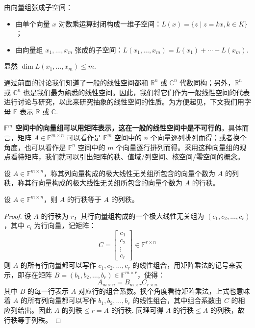 \begin{definition}
由向量组张成子空间：
\begin{itemize}
    \item 由单个向量 $x$ 对数乘运算封闭构成一维子空间：$L(x)=\{z\mid z=kx,k\in K\}$；
    \item 由向量组 $x_1,\ldots,x_m$ 张成的子空间：$L(x_1,\ldots,x_m)=L(x_1)+\cdots+L(x_m)$.
\end{itemize}
显然 $\dim L(x_1,\ldots,x_m)\leq m$.    
\end{definition}

通过前面的讨论我们知道了一般的线性空间都和 $\mathbb R^n$ 或 $\mathbb C^n$ 代数同构；另外，$\mathbb R^n$ 或 $\mathbb C^n$ 也是我们最为熟悉的线性空间。因此，我们将它们作为一般线性空间的代表进行讨论与研究，以此来研究抽象的线性空间的性质。为方便起见，下文我们用字母 $\mathbb F$ 表示 $\mathbb R$ 或 $\mathbb C$.

\textbf{$\mathbb F^m$ 空间中的向量组可以用矩阵表示，这在一般的线性空间中是不可行的}。具体而言，矩阵 $A\in\mathbb F^{m\times n}$ 可以看作是 $\mathbb F^m$ 空间中的 $n$ 个向量逐列排列而得；或者换个角度，也可以看作是 $\mathbb F^n$ 空间中的 $m$ 个向量逐行排列而得。采用这种向量组的观点看待矩阵，我们就可以引出矩阵的秩、值域/列空间、核空间/零空间的概念。

\begin{definition}[列秩，行秩]
设 $A\in\mathbb F^{m\times n}$，称其列向量构成的极大线性无关组所包含的向量个数为 $A$ 的列秩，称其行向量构成的极大线性无关组所包含的向量个数为 $A$ 的行秩。
\end{definition}

\begin{theorem}[行秩等于列秩]
设 $A\in\mathbb F^{m\times n}$，则 $A$ 的行秩等于 $A$ 的列秩。
\end{theorem}
\begin{proof}
设 $A$ 的行秩为 $r$，其行向量组构成的一个极大线性无关组为 $(c_1,c_2,\ldots,c_r)$，其中 $c_i$ 为行向量，记矩阵：
\[
    C=\begin{bmatrix}c_1\\c_2\\\vdots\\c_r\end{bmatrix}\in\mathbb F^{r\times n}
\]
则 $A$ 的所有行向量都可以写作 $c_1,c_2,\ldots,c_r$ 的线性组合，用矩阵乘法的记号来表示，即存在矩阵 $B=(b_1,b_2,\ldots,b_r)\in\mathbb F^{m\times r}$，使得：
\[
    A_{m\times n}=B_{m\times r}C_{r\times n}
\]
其中 $B$ 的每一行表示 $A$ 对应行的组合系数。换个角度看待矩阵乘法，上式也意味着 $A$ 的所有列向量都可以写作 $b_1,b_2,\ldots,b_r$ 的线性组合，其中组合系数由 $C$ 的相应列给出。因此 $A \text{ 的列秩} \leq r=A \text{ 的行秩}$. 同理可得 $A \text{ 的行秩}\leq A \text{ 的列秩}$，故行秩等于列秩。
\end{proof}

